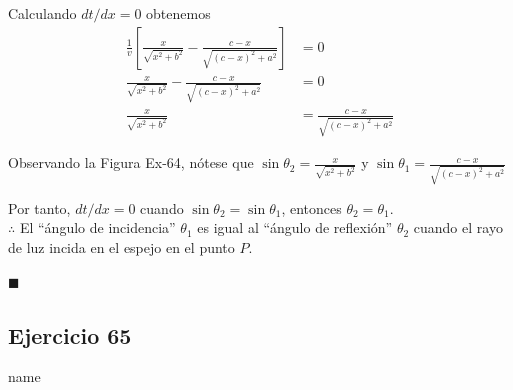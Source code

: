 \documentclass[12pt]{article}
\begin{document}
Calculando $dt/dx = 0$ obtenemos
\begin{align*}
  \frac{1}{v}\left[ \frac{x}{\sqrt{x^2+b^2}}-\frac{c-x}{\sqrt{(c-x)^2+a^2}} \right]
  &= 0 \\
  \frac{x}{\sqrt{x^2+b^2}}-\frac{c-x}{\sqrt{(c-x)^2+a^2}}
  &= 0 \\
  \frac{x}{\sqrt{x^2+b^2}}
  &=\frac{c-x}{\sqrt{(c-x)^2+a^2}}
\end{align*}

Observando la Figura Ex-64, nótese que $\sin{\theta_2}=\frac{x}{\sqrt{x^2+b^2}}$ y $\sin{\theta_1}=\frac{c-x}{\sqrt{(c-x)^2+a^2}}$

Por tanto, $dt/dx = 0$ cuando $\sin{\theta_2}=\sin{\theta_1}$, entonces $\theta_2 = \theta_1$. \\

$\therefore $ El ``ángulo de incidencia'' $\theta_1$ es igual al ``ángulo de reflexión'' $\theta_2$ cuando el rayo de luz incida en el espejo en el punto $P$.

\begin{flushright}
  $\blacksquare$
\end{flushright}

\subsection{Ejercicio 65} name \\
\end{document}
